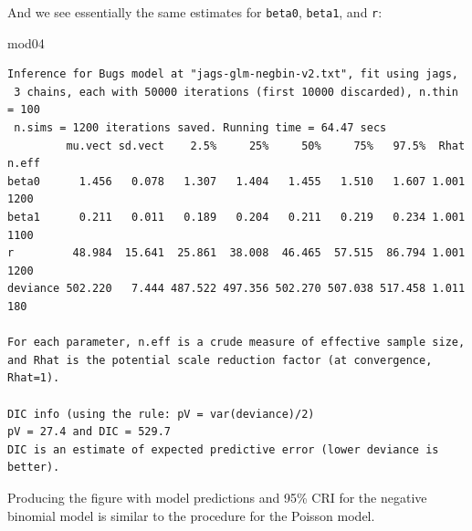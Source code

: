 \documentclass[
  13,
  letterpaper,
]{report}
\newenvironment{Shaded}{\begin{snugshade}}{\end{snugshade}}
\newcommand{\NormalTok}[1]{\textcolor[rgb]{0.00,0.23,0.31}{#1}}
\begin{document}
And we see essentially the same estimates for \texttt{beta0},
\texttt{beta1}, and \texttt{r}:

\begin{Shaded}
\begin{Highlighting}[]
\NormalTok{mod04}
\end{Highlighting}
\end{Shaded}

\begin{verbatim}
Inference for Bugs model at "jags-glm-negbin-v2.txt", fit using jags,
 3 chains, each with 50000 iterations (first 10000 discarded), n.thin = 100
 n.sims = 1200 iterations saved. Running time = 64.47 secs
         mu.vect sd.vect    2.5%     25%     50%     75%   97.5%  Rhat n.eff
beta0      1.456   0.078   1.307   1.404   1.455   1.510   1.607 1.001  1200
beta1      0.211   0.011   0.189   0.204   0.211   0.219   0.234 1.001  1100
r         48.984  15.641  25.861  38.008  46.465  57.515  86.794 1.001  1200
deviance 502.220   7.444 487.522 497.356 502.270 507.038 517.458 1.011   180

For each parameter, n.eff is a crude measure of effective sample size,
and Rhat is the potential scale reduction factor (at convergence, Rhat=1).

DIC info (using the rule: pV = var(deviance)/2)
pV = 27.4 and DIC = 529.7
DIC is an estimate of expected predictive error (lower deviance is better).
\end{verbatim}

Producing the figure with model predictions and 95\% CRI for the
negative binomial model is similar to the procedure for the Poisson
model.
\end{document}

